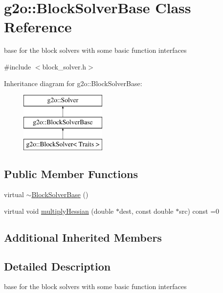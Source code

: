 \hypertarget{classg2o_1_1_block_solver_base}{}\section{g2o\+:\+:Block\+Solver\+Base Class Reference}
\label{classg2o_1_1_block_solver_base}


base for the block solvers with some basic function interfaces  




{\ttfamily \#include $<$block\+\_\+solver.\+h$>$}

Inheritance diagram for g2o\+:\+:Block\+Solver\+Base\+:\begin{figure}[H]
\begin{center}
\leavevmode
\includegraphics[height=3.000000cm]{classg2o_1_1_block_solver_base}
\end{center}
\end{figure}
\subsection*{Public Member Functions}
\begin{DoxyCompactItemize}
\item 
virtual \mbox{\hyperlink{classg2o_1_1_block_solver_base_a59aabc7d24599a7f7b251cc0040bcb0a}{$\sim$\+Block\+Solver\+Base}} ()
\item 
virtual void \mbox{\hyperlink{classg2o_1_1_block_solver_base_a4ff7072751bfa1b7fcf91f8219e18e13}{multiply\+Hessian}} (double $\ast$dest, const double $\ast$src) const =0
\end{DoxyCompactItemize}
\subsection*{Additional Inherited Members}


\subsection{Detailed Description}
base for the block solvers with some basic function interfaces 

